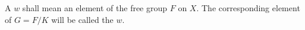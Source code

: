 A  $w$ shall mean an element of the free group $F$ on $X$. The corresponding element of $G = F/K$ will be called the  $w$.
